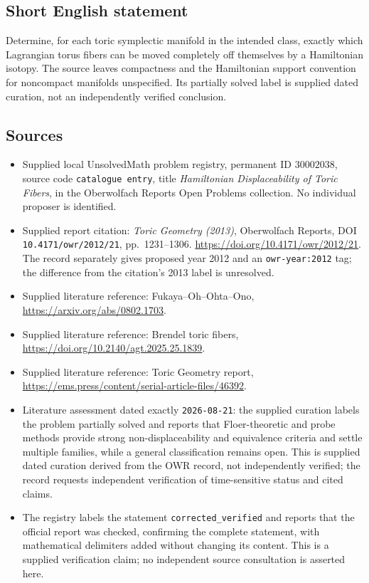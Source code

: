 \documentclass[11pt]{article}
\begin{document}
\subsection{Short English statement}
Determine, for each toric symplectic manifold in the intended class, exactly which Lagrangian torus fibers can be moved completely off themselves by a Hamiltonian isotopy. The source leaves compactness and the Hamiltonian support convention for noncompact manifolds unspecified. Its partially solved label is supplied dated curation, not an independently verified conclusion.
\subsection{Sources}
\begin{itemize}
\item Supplied local UnsolvedMath problem registry, permanent ID \(30002038\), source code \texttt{catalogue entry}, title \emph{Hamiltonian Displaceability of Toric Fibers}, in the Oberwolfach Reports Open Problems collection. No individual proposer is identified.
\item Supplied report citation: \emph{Toric Geometry (2013)}, Oberwolfach Reports, DOI \texttt{10.4171/owr/2012/21}, pp.~1231--1306. \url{https://doi.org/10.4171/owr/2012/21}. The record separately gives proposed year 2012 and an \texttt{owr-year:2012} tag; the difference from the citation's 2013 label is unresolved.
\item Supplied literature reference: Fukaya--Oh--Ohta--Ono, \url{https://arxiv.org/abs/0802.1703}.
\item Supplied literature reference: Brendel toric fibers, \url{https://doi.org/10.2140/agt.2025.25.1839}.
\item Supplied literature reference: Toric Geometry report, \url{https://ems.press/content/serial-article-files/46392}.
\item Literature assessment dated exactly \texttt{2026-08-21}: the supplied curation labels the problem partially solved and reports that Floer-theoretic and probe methods provide strong non-displaceability and equivalence criteria and settle multiple families, while a general classification remains open. This is supplied dated curation derived from the OWR record, not independently verified; the record requests independent verification of time-sensitive status and cited claims.
\item The registry labels the statement \texttt{corrected\_verified} and reports that the official report was checked, confirming the complete statement, with mathematical delimiters added without changing its content. This is a supplied verification claim; no independent source consultation is asserted here.
\end{itemize}
\end{document}
